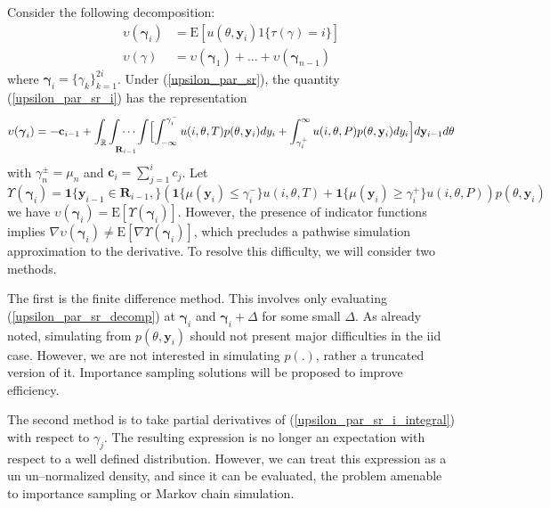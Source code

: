 \documentclass{article}
\begin{document}
Consider the following decomposition:
\begin{align}\label{upsilon_par_sr_i}
\upsilon(\boldsymbol{\gamma}_i)&=\mathrm{E}[u(\theta,\mathbf{y}_i)1\{\tau(\gamma)=i\}]\\
\label{upsilon_par_sr_decomp} \upsilon(\gamma)
&=\upsilon(\boldsymbol{\gamma}_1)+...+\upsilon(\boldsymbol{\gamma}_{n-1})
\end{align}where
$\boldsymbol{\gamma}_i=\{\gamma_k\}_{k=1}^{2i}$. Under
(\ref{upsilon_par_sr}), the quantity (\ref{upsilon_par_sr_i}) has
the representation
\begin{equation}\label{upsilon_par_sr_i_integral}
\upsilon(\boldsymbol{\gamma}_i)=-\mathbf{c}_{i-1}+\int_{\mathbb{R}}\idotsint\limits_{\mathbf{R}_{i-1}}\Bigl[\int_{-\infty}^{\gamma_i^{-}}u(i,\theta,T)p(\theta,\mathbf{y}_{i})
d
y_i+\int_{\gamma_i^{+}}^{\infty}u(i,\theta,P)p(\theta,\mathbf{y}_{i})d
y_i\Bigr]d \mathbf{y}_{i-1}  d \theta
\end{equation}with $\gamma_{n}^{\pm}=\mu_{n}$ and $\mathbf{c}_i=\sum_{j=1}^{i}
c_j$. Let
\begin{equation}\Upsilon(\boldsymbol{\gamma}_i)=\boldsymbol{1}\{\mathbf{y}_{i-1}\in
\mathbf{R}_{i-1}, \}(\boldsymbol{1}\{\mu(\mathbf{y}_i)\leq
\gamma_{i}^{-}\}u(i,\theta,T)+\boldsymbol{1}\{\mu(\mathbf{y}_i)\geq
\gamma_{i}^{+}\}u(i,\theta,P))p(\theta,\mathbf{y}_{i})\end{equation}we
have
$\upsilon(\boldsymbol{\gamma}_i)=\mathrm{E}[\Upsilon(\boldsymbol{\gamma}_i)]$.
However, the presence of indicator functions implies $\nabla
\upsilon(\boldsymbol{\gamma}_i)\neq
\mathrm{E}[\nabla\Upsilon(\boldsymbol{\gamma}_i)]$, which precludes
a pathwise simulation approximation to the derivative. To resolve
this difficulty, we will consider two methods.

The first is the finite difference method. This involves only
evaluating (\ref{upsilon_par_sr_decomp}) at $\boldsymbol{\gamma}_i$
and $\boldsymbol{\gamma}_i+\Delta$ for some small $\Delta$. As
already noted, simulating from $p(\theta,\mathbf{y}_i)$ should not
present major difficulties in the iid case. However, we are not
interested in simulating $p(.)$, rather a truncated version of it.
Importance sampling solutions will be proposed to improve
efficiency.

The second method is to take partial derivatives of
(\ref{upsilon_par_sr_i_integral}) with respect to $\gamma_j$. The
resulting expression is no longer an expectation with respect to a
well defined distribution. However, we can treat this expression as
a un un--normalized density, and since it can be evaluated, the
problem amenable to importance sampling or Markov chain simulation.
\end{document}
